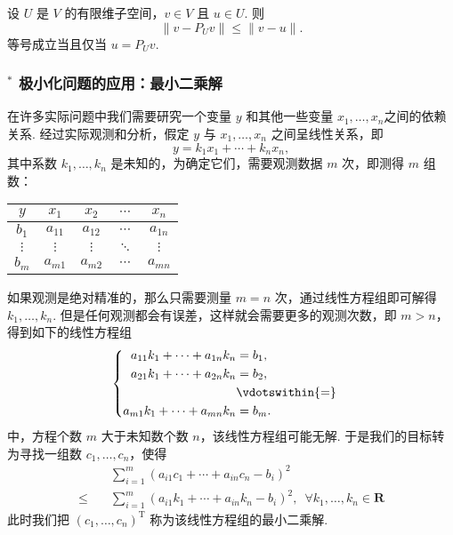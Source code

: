\begin{theorem}
    设 $ U $ 是 $ V $ 的有限维子空间，$ v \in V $ 且 $ u \in U $. 则
    \[\lVert v - P_U v \rVert \leqslant \lVert v - u \rVert. \]
    等号成立当且仅当 $ u = P_U v $.
\end{theorem}

\subsubsection*{$^*$ 极小化问题的应用：最小二乘解}

在许多实际问题中我们需要研究一个变量 $ y $ 和其他一些变量 $ x_1, \ldots , x_n $之间的依赖关系. 经过实际观测和分析，假定 $ y $ 与 $ x_1, \ldots , x_n $ 之间呈线性关系，即
\[ y = k_1 x_1 + \cdots + k_n x_n, \]
其中系数 $ k_1, \ldots , k_n $ 是未知的，为确定它们，需要观测数据 $ m $ 次，即测得 $ m $ 组数：
\begin{center}
    \begin{tabular}{ccccc}
        $ y $      & $ x_1 $    & $ x_2 $    & $ \cdots $ & $ x_n $    \\
        \hline
        $ b_1 $    & $ a_{11} $ & $ a_{12} $ & $ \cdots $ & $ a_{1n}$  \\
        $ \vdots $ & $ \vdots $ & $ \vdots $ & $ \ddots $ & $ \vdots $ \\
        $ b_m $    & $ a_{m1} $ & $ a_{m2} $ & $ \cdots $ & $ a_{mn}$
    \end{tabular}
\end{center}
如果观测是绝对精准的，那么只需要测量 $ m = n $ 次，通过线性方程组即可解得 $ k_1, \ldots , k_n $. 但是任何观测都会有误差，这样就会需要更多的观测次数，即 $ m > n $，得到如下的线性方程组
\[ \begin{cases} \begin{aligned}
            a_{11}k_1 + \cdots + a_{1n}k_n & = b_1,          \\
            a_{21}k_1 + \cdots + a_{2n}k_n & = b_2,          \\
                                           & \vdotswithin{=} \\
            a_{m1}k_1 + \cdots + a_{mn}k_n & = b_m.          \\
        \end{aligned} \end{cases} \]
中，方程个数 $ m $ 大于未知数个数 $ n $，该线性方程组可能无解. 于是我们的目标转为寻找一组数 $ c_1, \ldots , c_n $，使得
\begin{align*}
                    & \sum_{ i = 1 }^{m} (a_{i1}c_1 + \cdots + a_{in}c_n - b_i )^{2}                                                    \\
    \leqslant \quad & \sum_{ i = 1 }^{m} (a_{i1}k_1 + \cdots + a_{in}k_n - b_i )^{2}, \enspace \forall k_1, \ldots , k_n \in \mathbf{R}
\end{align*}
此时我们把 $ (c_1, \ldots , c_n)^{\mathrm{T}} $ 称为该线性方程组的最小二乘解.

